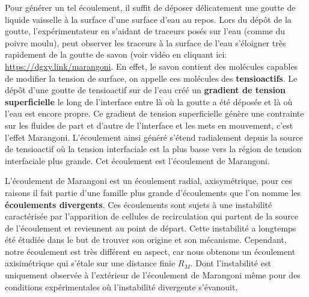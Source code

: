 \documentclass[french, 10pt]{article}
\begin{document}

Pour générer un tel écoulement, il suffit de déposer délicatement une goutte de liquide vaisselle à la surface d'une surface d'eau au repos. Lors du dépôt de la goutte, l'expérimentateur en s'aidant de traceurs posés sur l'eau (comme du poivre moulu), peut observer les traceurs à la surface de l'eau s'éloigner très rapidement de la goutte de savon (voir vidéo en cliquant ici: \url{https://dgxy.link/marangoni}. En effet, le savon contient des molécules capables de modifier la tension de surface, on appelle ces molécules des \textbf{tensioactifs}. Le dépôt d'une goutte de tensioactif sur de l'eau créé un \textbf{gradient de tension superficielle} le long de l'interface entre là où la goutte a été déposée et là où l'eau est encore propre. Ce gradient de tension superficielle génère une contrainte sur les fluides de part et d'autre de l'interface et les mets en mouvement, c'est l'effet Marangoni. L'écoulement ainsi généré s'étend radialement depuis la source de tensioactif où la tension interfaciale est la plus basse vers la région de tension interfaciale plus grande. Cet écoulement est l'écoulement de Marangoni.\medskip

L'écoulement de Marangoni est un écoulement radial, axisymétrique, pour ces raisons il fait partie d'une famille plus grande d'écoulements que l'on nomme les \textbf{écoulements divergents}. Ces écoulements sont sujets à une instabilité caractérisée par l'apparition de cellules de recirculation qui partent de la source de l'écoulement et reviennent au point de départ. Cette instabilité a longtemps été étudiée dans le but de trouver son origine et son mécanisme. Cependant, notre écoulement est très différent en aspect, car nous obtenons un écoulement axisimétrique qui s'étale sur une distance finie $R_M$. Dont l'instabilité est uniquement observée à l'extérieur de l'écoulement de Marangoni même pour des conditions expérimentales où l'instabilité divergente s'évanouit.\medskip
\end{document}
